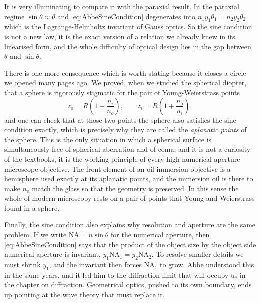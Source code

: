                 It is very illuminating to compare it with the paraxial result. In the paraxial regime $\sin\theta\approx\theta$ and \ref{eq:AbbeSineCondition} degenerates into $n_1y_1\theta_1 = n_2y_2\theta_2$, which is the Lagrange-Helmholtz invariant of Gauss optics. So the sine condition is not a new law, it is the exact version of a relation we already knew in its linearised form, and the whole difficulty of optical design lies in the gap between $\theta$ and $\sin\theta$.

                There is one more consequence which is worth stating because it closes a circle we opened many pages ago. We proved, when we studied the spherical diopter, that a sphere is rigorously stigmatic for the pair of Young-Weierstrass points
                \begin{equation*}
                    z_o = R\left( 1 + \frac{n_i}{n_o} \right), \qquad z_i = R\left( 1 + \frac{n_o}{n_i} \right),
                \end{equation*}
                and one can check that at those two points the sphere also satisfies the sine condition exactly, which is precisely why they are called the \textit{aplanatic points} of the sphere. This is the only situation in which a spherical surface is simultaneously free of spherical aberration and of coma, and it is not a curiosity of the textbooks, it is the working principle of every high numerical aperture microscope objective. The front element of an oil immersion objective is a hemisphere used exactly at its aplanatic points, and the immersion oil is there to make $n_o$ match the glass so that the geometry is preserved. In this sense the whole of modern microscopy rests on a pair of points that Young and Weierstrass found in a sphere.

                Finally, the sine condition also explains why resolution and aperture are the same problem. If we write $\mathrm{NA} = n\sin\theta$ for the numerical aperture, then \ref{eq:AbbeSineCondition} says that the product of the object size by the object side numerical aperture is invariant, $y_1\mathrm{NA}_1 = y_2\mathrm{NA}_2$. To resolve smaller details we must shrink $y_1$, and the invariant then forces $\mathrm{NA}_1$ to grow. Abbe understood this in the same years, and it led him to the diffraction limit that will occupy us in the chapter on diffraction. Geometrical optics, pushed to its own boundary, ends up pointing at the wave theory that must replace it.
